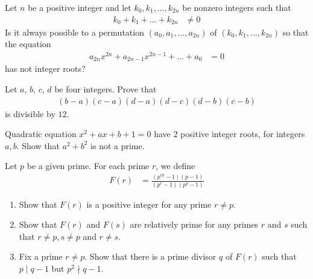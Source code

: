 \begin{problem}
	Let $n$ be a positive integer and let $k_0,k_1, \dots,k_{2n}$ be nonzero integers such that
		\begin{align*}
			k_0+k_1 +\dots+k_{2n}
				& \neq 0
		\end{align*}
	Is it always possible to a permutation $(a_0,a_1,\dots,a_{2n})$ of $(k_0,k_1,\dots,k_{2n})$ so that the equation
		\begin{align*}
			a_{2n}x^{2n}+a_{2n-1}x^{2n-1}+\dots+a_0
				& =0
		\end{align*}
	has not integer roots? %
\end{problem}

\begin{problem}
	Let $a$, $b$, $c$, $d$ be four integers. Prove that
		\begin{align*}
			\left(b-a\right)\left(c-a\right)\left(d-a\right)\left(d-c\right)\left(d-b\right)\left(c-b\right)
		\end{align*}
	is divisible by $12$. %
\end{problem}

\begin{problem}
	Quadratic equation $ x^2+ax+b+1=0$ have 2 positive integer roots, for integers $ a,b$. Show that $ a^2+b^2$ is not a prime. %
\end{problem}

\begin{problem}
	Let $p$ be a given prime. For each prime $r$, we define
	\begin{align*}
		F(r) &= \frac{(p^{rp} -1)(p-1)}{(p^r-1)(p^p-1)}
	\end{align*}
	\begin{enumerate}
		\item Show that $F(r)$ is a positive integer for any prime $r \neq p$.
		\item Show that $F(r)$ and $F(s)$ are relatively prime for any primes $r$ and $s$ such that $r \neq p, s\neq p$ and $r \neq s$.
		\item Fix a prime $r \neq p$. Show that there is a prime divisor $q$ of $F(r)$ such that $p \mid q - 1$ but $p^2 \nmid q - 1$.
	\end{enumerate}
\end{problem}

